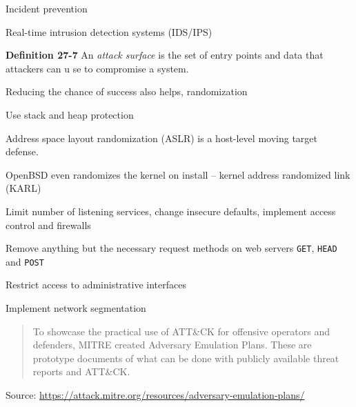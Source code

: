 \documentclass[Screen16to9,17pt]{foils}
\begin{document}
\begin{list2}
\item Incident prevention
\item Real-time intrusion detection systems (IDS/IPS)
\item {\bf Definition 27-7} An \emph{attack surface} is the set of entry points and data that attackers can u
se to compromise a system.
\item Reducing the chance of success also helps, randomization
\item Use stack and heap protection
\item Address space layout randomization (ASLR) is a host-level moving target defense.
\item OpenBSD even randomizes the kernel on install -- kernel address randomized link (KARL)
\item Limit number of listening services, change insecure defaults, implement access control and firewalls
\item Remove anything but the necessary request methods on web servers \verb+GET+, \verb+HEAD+ and \verb+POST+
\item Restrict access to administrative interfaces
\item Implement network segmentation
\end{list2}




\begin{quote}
To showcase the practical use of ATT\&CK for offensive operators and defenders, MITRE created Adversary Emulation Plans. These are prototype documents of what can be done with publicly available threat reports and ATT\&CK.
\end{quote}
Source: \url{https://attack.mitre.org/resources/adversary-emulation-plans/}


\end{document}

